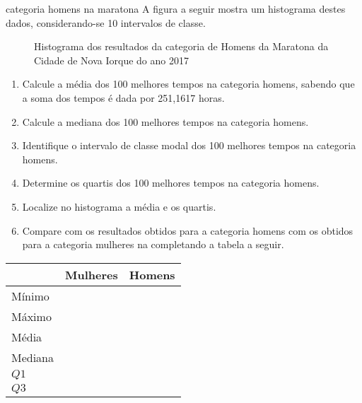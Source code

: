 \begin{task}{ categoria homens na maratona}
A figura a seguir mostra um histograma destes dados, considerando-se 10 intervalos de classe.

\begin{figure}[H]
\centering
\capstart

\noindent{}
\caption{Histograma dos resultados da categoria de Homens da Maratona da Cidade de Nova Iorque do ano 2017}\label{\detokenize{PE104-2:fig-histograma-maratona-homens}}\label{\detokenize{PE104-2:id3}}\end{figure}
\begin{enumerate}
\item {} 
Calcule a média dos 100 melhores tempos na categoria homens, sabendo que a soma dos tempos é dada por 251,1617 horas.

\item {} 
Calcule a mediana dos 100 melhores tempos na categoria homens.

\item {} 
Identifique o intervalo de classe modal dos 100 melhores tempos na categoria homens.

\item {} 
Determine os quartis dos 100 melhores tempos na categoria homens.

\item {} 
Localize no histograma a média e os quartis.

\item {} 
Compare com os resultados obtidos para a categoria homens com os obtidos para a categoria mulheres na  completando a tabela a seguir.

\end{enumerate}


\begin{savenotes}\sphinxattablestart
\centering
{}
\label{\detokenize{PE104-2:id4}}
\sphinxaftercaption
\begin{tabulary}{\linewidth}[t]{|T|T|T|}
\hline
&
Mulheres
&
Homens
\\
\hline
Mínimo
&&\\
\hline
Máximo
&&\\
\hline
Média
&&\\
\hline
Mediana
&&\\
\hline
\(Q1\)
&&\\
\hline
\(Q3\)
&&\\
\hline
\end{tabulary}
\par
\sphinxattableend\end{savenotes}
\end{task}

